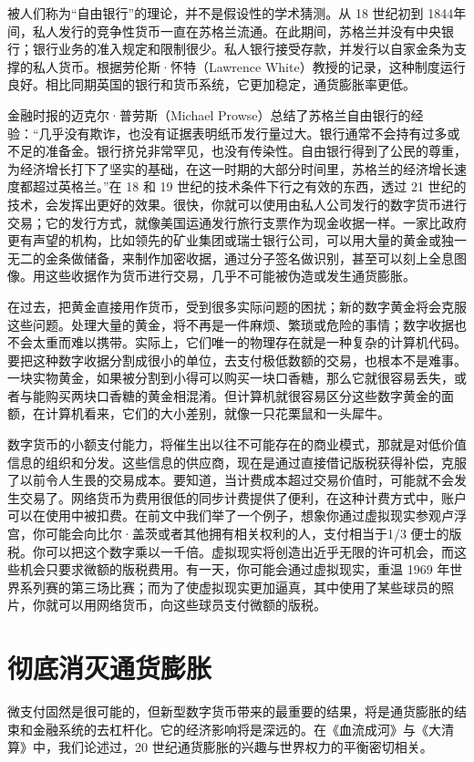 被人们称为“自由银行”的理论，并不是假设性的学术猜测。从 18 世纪初到 1844年间，私人发行的竞争性货币一直在苏格兰流通。在此期间，苏格兰并没有中央银行；银行业务的准入规定和限制很少。私人银行接受存款，并发行以自家金条为支撑的私人货币。根据劳伦斯·怀特（Lawrence White）教授的记录，这种制度运行良好。相比同期英国的银行和货币系统，它更加稳定，通货膨胀率更低。

金融时报的迈克尔·普劳斯（Michael Prowse）总结了苏格兰自由银行的经验：“几乎没有欺诈，也没有证据表明纸币发行量过大。银行通常不会持有过多或不足的准备金。银行挤兑非常罕见，也没有传染性。自由银行得到了公民的尊重，为经济增长打下了坚实的基础，在这一时期的大部分时间里，苏格兰的经济增长速度都超过英格兰。”在 18 和 19 世纪的技术条件下行之有效的东西，透过 21 世纪的技术，会发挥出更好的效果。很快，你就可以使用由私人公司发行的数字货币进行交易；它的发行方式，就像美国运通发行旅行支票作为现金收据一样。一家比政府更有声望的机构，比如领先的矿业集团或瑞士银行公司，可以用大量的黄金或独一无二的金条做储备，来制作加密收据，通过分子签名做识别，甚至可以刻上全息图像。用这些收据作为货币进行交易，几乎不可能被伪造或发生通货膨胀。

在过去，把黄金直接用作货币，受到很多实际问题的困扰；新的数字黄金将会克服这些问题。处理大量的黄金，将不再是一件麻烦、繁琐或危险的事情；数字收据也不会太重而难以携带。实际上，它们唯一的物理存在就是一种复杂的计算机代码。要把这种数字收据分割成很小的单位，去支付极低数额的交易，也根本不是难事。一块实物黄金，如果被分割到小得可以购买一块口香糖，那么它就很容易丢失，或者与能购买两块口香糖的黄金相混淆。但计算机就很容易区分这些数字黄金的面额，在计算机看来，它们的大小差别，就像一只花栗鼠和一头犀牛。

数字货币的小额支付能力，将催生出以往不可能存在的商业模式，那就是对低价值信息的组织和分发。这些信息的供应商，现在是通过直接借记版税获得补偿，克服了以前令人生畏的交易成本。要知道，当计费成本超过交易价值时，可能就不会发生交易了。网络货币为费用很低的同步计费提供了便利，在这种计费方式中，账户可以在使用中被扣费。在前文中我们举了一个例子，想象你通过虚拟现实参观卢浮宫，你可能会向比尔·盖茨或者其他拥有相关权利的人，支付相当于1/3 便士的版税。你可以把这个数字乘以一千倍。虚拟现实将创造出近乎无限的许可机会，而这些机会只要求微额的版税费用。有一天，你可能会通过虚拟现实，重温 1969 年世界系列赛的第三场比赛；而为了使虚拟现实更加逼真，其中使用了某些球员的照片，你就可以用网络货币，向这些球员支付微额的版税。

\section{彻底消灭通货膨胀}
微支付固然是很可能的，但新型数字货币带来的最重要的结果，将是通货膨胀的结束和金融系统的去杠杆化。它的经济影响将是深远的。在《血流成河》与《大清算》中，我们论述过，20 世纪通货膨胀的兴趣与世界权力的平衡密切相关。

